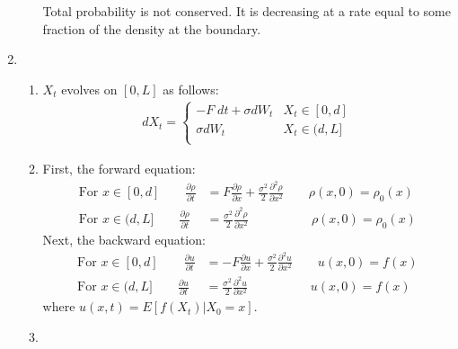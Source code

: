 \documentclass[12pt]{article}
\theoremstyle{plain}
\theoremstyle{definition}
\theoremstyle{remark}
\begin{document}
\begin{enumerate}
\begin{enumerate}
        Total probability is not conserved. It is decreasing at a rate
        equal to some fraction of the density at the boundary.
    \end{enumerate}

  \item %
    \begin{enumerate}
      \item %
        $X_t$ evolves on $[0,L]$ as follows:
        \begin{align*}
          dX_t =
          \begin{cases}
            -F \; dt + \sigma dW_t & X_t \in [0,d]\\
            \sigma dW_t & X_t \in (d,L]\\
          \end{cases}
        \end{align*}

      \item %
        First, the forward equation:
        \begin{align*}
          \text{For $x\in[0,d]$}\qquad
          \frac{\partial \rho}{\partial t}
          &=
          F\frac{\partial \rho}{\partial x}
          + \frac{\sigma^2}{2} \frac{\partial^2 \rho}{\partial x^2}
          \qquad
          \rho(x,0) = \rho_0(x)
          \\
          \text{For $x\in(d,L]$}\qquad
          \frac{\partial \rho}{\partial t}
          &=
          \frac{\sigma^2}{2} \frac{\partial^2 \rho}{\partial x^2}
          \qquad\qquad\quad
          \rho(x,0) = \rho_0(x)
        \end{align*}
        Next, the backward equation:
        \begin{align*}
          \text{For $x\in[0,d]$}\qquad
          \frac{\partial u}{\partial t}
          &= -F \frac{\partial u}{\partial x}
          + \frac{\sigma^2}{2}\frac{\partial^2 u}{\partial x^2}
          \qquad
          u(x,0) = f(x)\\
          \text{For $x\in(d,L]$}\qquad
          \frac{\partial u}{\partial t}
          &=
          \frac{\sigma^2}{2}\frac{\partial^2 u}{\partial x^2}
          \qquad\quad\qquad
          u(x,0) = f(x)
        \end{align*}
        where $u(x,t) = E[f(X_t)|X_0=x]$.

      \item %


\end{enumerate}
\end{enumerate}
\end{document}
